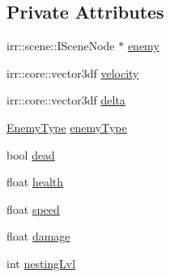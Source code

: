 \subsection*{Private Attributes}
\begin{DoxyCompactItemize}
\item 
irr\-::scene\-::\-I\-Scene\-Node $\ast$ \hyperlink{class_enemy_a4befe0ced393215de590152256bf1ee4}{enemy}
\item 
irr\-::core\-::vector3df \hyperlink{class_enemy_a01b8136e0754f278e48b63f25e2361bc}{velocity}
\item 
irr\-::core\-::vector3df \hyperlink{class_enemy_a2aeaae8acd857242e40db8b034566351}{delta}
\item 
\hyperlink{class_enemy_a98c2ee2c2081001de17a4bc9fa8da94f}{Enemy\-Type} \hyperlink{class_enemy_a36bcaf317708c0ed35835bc0f79c7719}{enemy\-Type}
\item 
bool \hyperlink{class_enemy_a4b1b61e7bc79aca01f3e4b3ef19cb787}{dead}
\item 
float \hyperlink{class_enemy_a131756bf793f8d63a3b9a2b728992380}{health}
\item 
float \hyperlink{class_enemy_a98766d083fc49e746a37d0dc69be09e0}{speed}
\item 
float \hyperlink{class_enemy_a5d5917c222119c1d8eb3183c27c7adb7}{damage}
\item 
int \hyperlink{class_enemy_a28a5b00705199ef986435768edb53d48}{nesting\-Lvl}
\end{DoxyCompactItemize}


